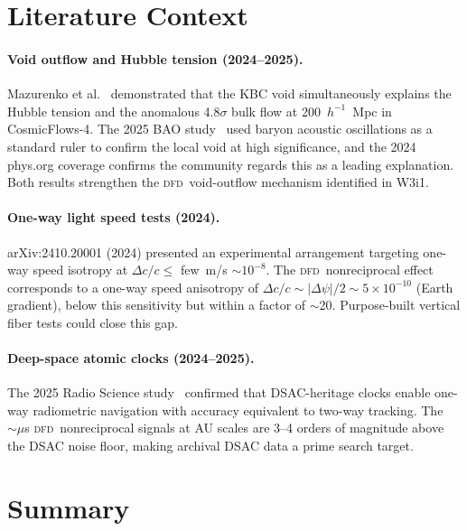 \documentclass[aps,prd,twocolumn,superscriptaddress,nofootinbib,longbibliography]{revtex4-2}
\newcommand{\DFD}{\textsc{dfd}}
\begin{document}
\section{Literature Context}
\label{sec:lit}

\paragraph{Void outflow and Hubble tension (2024--2025).}
Mazurenko et al.~\cite{Mazurenko2024} demonstrated that the KBC
void simultaneously explains the Hubble tension and the anomalous
4.8$\sigma$ bulk flow at 200~$h^{-1}$~Mpc in CosmicFlows-4.
The 2025 BAO study~\cite{LocalVoidBAO2025} used baryon acoustic
oscillations as a standard ruler to confirm the local void at high
significance, and the 2024 phys.org coverage confirms the community
regards this as a leading explanation.  Both results strengthen the
\DFD\ void-outflow mechanism identified in W3i1.

\paragraph{One-way light speed tests (2024).}
arXiv:2410.20001 (2024) presented an experimental arrangement
targeting one-way speed isotropy at $\Delta c/c \leq$ few~m/s
$\sim 10^{-8}$.  The \DFD\ nonreciprocal effect corresponds to a
one-way speed anisotropy of $\Delta c/c \sim |\Delta\psi|/2
\sim 5\times10^{-10}$ (Earth gradient), below this sensitivity
but within a factor of $\sim$20.  Purpose-built vertical fiber
tests could close this gap.

\paragraph{Deep-space atomic clocks (2024--2025).}
The 2025 Radio Science study~\cite{DSAC-Ely2025} confirmed that
DSAC-heritage clocks enable one-way radiometric navigation with
accuracy equivalent to two-way tracking.  The $\sim\mu$s \DFD\
nonreciprocal signals at AU scales are 3--4 orders of magnitude
above the DSAC noise floor, making archival DSAC data a prime
search target.

\section{Summary}
\label{sec:summary}
\end{document}
